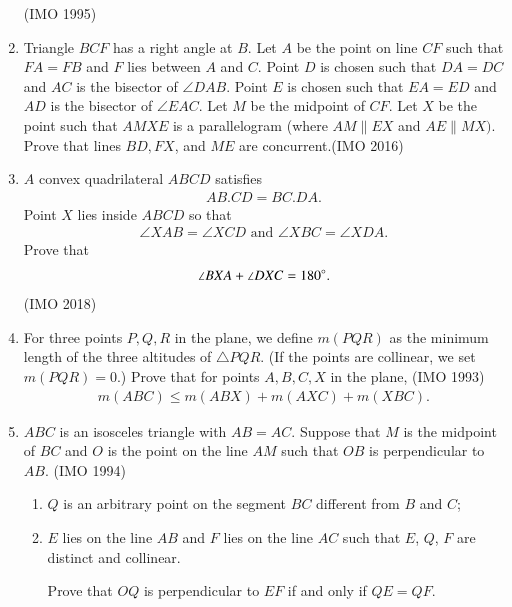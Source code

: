 \begin{enumerate}[label=\thesubsection.\arabic*,ref=\thesubsection.\theenumi]
	\hfill (IMO  1995)
 \item Triangle $BCF$ has a right angle at $B$. Let $A$ be the point on line $CF$ such that $FA=FB$ and $F$ lies between $A$ and $C$. Point $D$ is chosen such that $DA = DC$ and $AC$ is the bisector of $\angle DAB$. Point $E$ is chosen such that $EA= ED$ and $AD$ is the bisector of $\angle EAC$. Let $M$ be the midpoint of $CF$. Let $X$ be the point such that $AMXE$ is a parallelogram (where $AM \parallel EX$ and $AE \parallel MX)$. Prove that lines $BD, FX$, and $ME$ are concurrent.\hfill (IMO  2016)
\item $A$ convex quadrilateral $ABCD$ satisfies \begin{align*}AB.CD=BC.DA.\end{align*} Point $X$ lies inside $ABCD$ so that \begin{align*}\angle XAB=\angle XCD \text{ and } \angle XBC=\angle XDA.    \end{align*} Prove that\begin{align*}\angle BXA+\angle DXC=180\degree.\end{align*}\hfill (IMO  2018)
\item For three points $P, Q, R$ in the plane, we define $m(PQR)$ as the minimum length of the three altitudes of $\triangle PQR$. (If the points are collinear, we set $m(PQR) = 0$.)                                                                           
  Prove that for points $A, B, C, X$ in the plane,
 \hfill(IMO  1993)
\begin{align*}
                                                     m(ABC) \leq m(ABX) + m(AXC) + m(XBC).
\end{align*}
\item $ABC$ is an isosceles triangle with $AB = AC$. Suppose that  
$M$ is the midpoint of $BC$ and $O$ is the point on the line $AM$ such that $OB$ is perpendicular to $AB$.
\hfill(IMO  1994)
\begin{enumerate}
\item $Q$ is an arbitrary point on the segment $BC$ different from $B$ and $C$;                           
\item $E$ lies on the line $AB$ and $F$ lies on the line $AC$ such that $E$, $Q$, $F$ are distinct and collinear.
 
		 Prove that $OQ$ is perpendicular to $EF$ if and only if $QE=QF$.    
\end{enumerate}
%
\end{enumerate}
